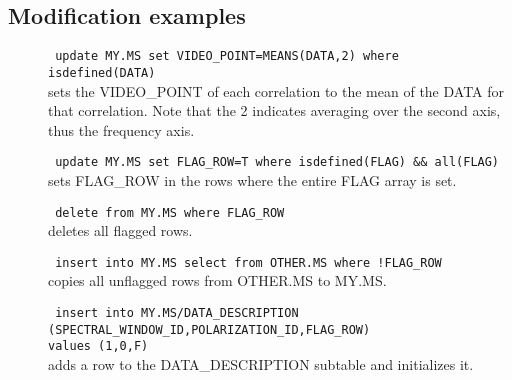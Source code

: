 \subsection{\label{TAQL:MODEXAMPLES}Modification examples}
\begin{description}
  \item[] \texttt{ update MY.MS set VIDEO\_POINT=MEANS(DATA,2)
                   where isdefined(DATA) }
      \\sets the VIDEO\_POINT of each correlation to the mean of the
      DATA for that correlation. Note that the 2 indicates averaging over
      the second axis, thus the frequency axis.

  \item[] \texttt{ update MY.MS set FLAG\_ROW=T where isdefined(FLAG) \&\& all(FLAG)}
      \\sets FLAG\_ROW in the rows where the entire FLAG array is set.

  \item[] \texttt{ delete from MY.MS where FLAG\_ROW}
      \\deletes all flagged rows.

  \item[] \texttt{ insert into MY.MS select from OTHER.MS where !FLAG\_ROW}
      \\copies all unflagged rows from OTHER.MS to MY.MS.

  \item[] \texttt{ insert into MY.MS/DATA\_DESCRIPTION}
          \\\texttt{(SPECTRAL\_WINDOW\_ID,POLARIZATION\_ID,FLAG\_ROW)}
          \\\texttt{values (1,0,F)}
      \\adds a row to the DATA\_DESCRIPTION subtable and initializes it.

\end{description}

